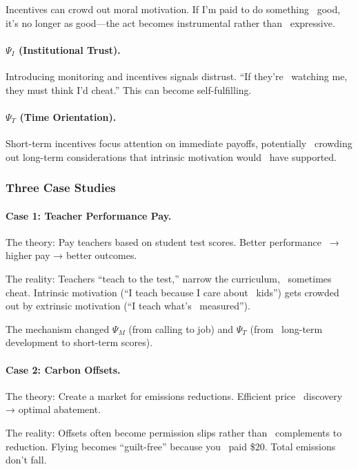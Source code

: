 Incentives can crowd out moral motivation. If I'm paid to do something \
good, it's no longer as good---the act becomes instrumental rather than \
expressive.

\paragraph{$\Psi_I$ (Institutional Trust).}

Introducing monitoring and incentives signals distrust. ``If they're \
watching me, they must think I'd cheat.'' This can become self-fulfilling.

\paragraph{$\Psi_T$ (Time Orientation).}

Short-term incentives focus attention on immediate payoffs, potentially \
crowding out long-term considerations that intrinsic motivation would \
have supported.

\subsubsection{Three Case Studies}

\paragraph{Case 1: Teacher Performance Pay.}

The theory: Pay teachers based on student test scores. Better performance \
→ higher pay → better outcomes.

The reality: Teachers ``teach to the test,'' narrow the curriculum, \
sometimes cheat. Intrinsic motivation (``I teach because I care about \
kids'') gets crowded out by extrinsic motivation (``I teach what's \
measured'').

The mechanism changed $\Psi_M$ (from calling to job) and $\Psi_T$ (from \
long-term development to short-term scores).

\paragraph{Case 2: Carbon Offsets.}

The theory: Create a market for emissions reductions. Efficient price \
discovery → optimal abatement.

The reality: Offsets often become permission slips rather than \
complements to reduction. Flying becomes ``guilt-free'' because you \
paid \$20. Total emissions don't fall.

